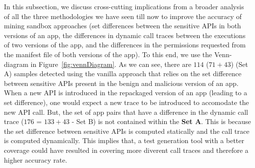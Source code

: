 
In this subsection, we discuss cross-cutting implications from a broader analysis of all the three methodologies we have seen till now to improve the accuracy of mining sandbox approaches (set differences between the sensitive APIs in both versions of an app, the differences in dynamic call traces between the executions of two versions of the app, and the differences in the permissions requested from the manifest file of both versions of the app). To this end, we use the Venn-diagram in Figure~\ref{fig:vennDiagram}.  As we can see, there are $114$ ($71+43$) (Set A) samples detected using the vanilla approach that relies on the set difference between sensitive APIs present in the benign and malicious version of an app. When a new API is introduced in the repackaged version of an app (leading to a set difference), one would expect a new trace to be introduced to accomodate the new API call. But, the set of app pairs that have a difference in the dynamic call trace ($176$ = $133+43$ - Set B) is not contained within the \textbf{Set A}. This is because the set difference between sensitive APIs is computed statically and the call trace is computed dynamically. This implies that, a test generation tool with a better coverage could have resulted in covering more diverent call traces and therefore a higher accuracy rate.



